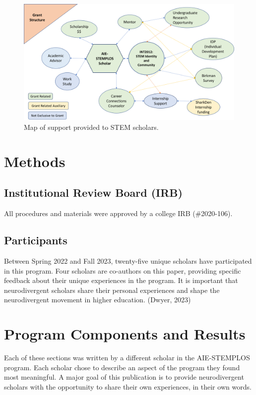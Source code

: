 \documentclass[11.5pt]{sig-alternate}
\begin{document}
\begin{large}
\begin{figure}[htb]
    \centering
    \includegraphics[width=\textwidth]{fig1.png}
     \captionsetup{font=large, labelfont=bf}
    \caption{Map of support provided to STEM scholars.}
    \label{Figure 1}
\end{figure}

\section*{Methods}
\subsection*{Institutional Review Board (IRB)}
All procedures and materials were approved by a college IRB (\#2020-106).

\subsection*{Participants}

Between Spring 2022 and Fall 2023, twenty-five unique scholars have participated in this program. Four scholars are co-authors on this paper, providing specific feedback about their unique experiences in the program. It is important that neurodivergent scholars share their personal experiences and shape the neurodivergent movement in higher education. (Dwyer, 2023)

\section*{Program Components and Results}
Each of these sections was written by a different scholar in the AIE-STEMPLOS program. Each scholar chose to describe an aspect of the program they found most meaningful. A major goal of this publication is to provide neurodivergent scholars with the opportunity to share their own experiences, in their own words.


\end{large}
\end{document}
